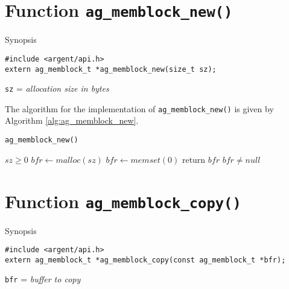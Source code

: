 %

\section{Function \texttt{ag\_memblock\_new()}}


\begin{bclogo}[logo=\bccrayon, noborder=true, barre=snake, couleurBarre=gray]
  {Synopsis}
\lstset{style=SYNOPSIS}

\begin{lstlisting}[linewidth=1.0\linewidth]
#include <argent/api.h>
extern ag_memblock_t *ag_memblock_new(size_t sz);
\end{lstlisting}

\scriptsize
\texttt{sz} = \emph{allocation size in bytes}
\end{bclogo}

The algorithm for the implementation of \verb|ag_memblock_new()| is given by
Algorithm \ref{alg:ag_memblock_new}.

\begin{algorithm}
\scriptsize
\caption{\texttt{ag\_memblock\_new()}}
\label{alg:ag_memblock_new}

\begin{algorithmic}
\Require $sz \geq 0$
\State $bfr \gets malloc(sz)$
\State $bfr \gets memset(0)$
\State return $bfr$
\EndProcedure
\Ensure $bfr \neq null$
\end{algorithmic}

\end{algorithm}

%


\section{Function \texttt{ag\_memblock\_copy()}}
\begin{bclogo}[logo=\bccrayon, noborder=true, barre=snake, couleurBarre=gray]
  {Synopsis}
\lstset{style=SYNOPSIS}
\begin{lstlisting}[linewidth=1.0\linewidth]
#include <argent/api.h>
extern ag_memblock_t *ag_memblock_copy(const ag_memblock_t *bfr);
\end{lstlisting}
\scriptsize
\texttt{bfr} = \emph{buffer to copy}
\end{bclogo}


